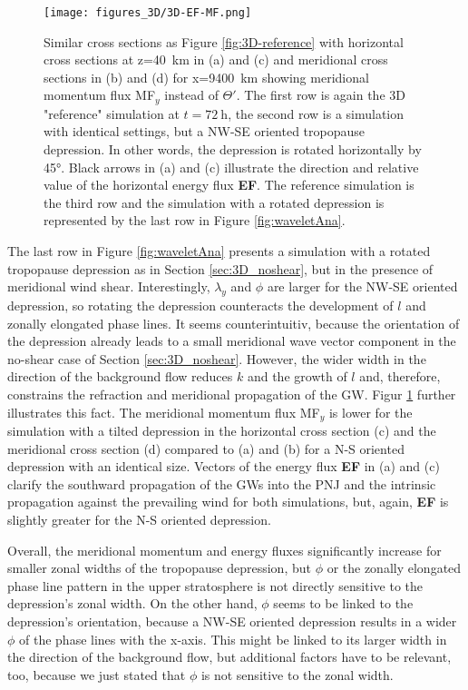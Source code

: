 \begin{figure}[t]
    \centering
    \texttt{[image: figures\_3D/3D-EF-MF.png]}
    \caption{Similar cross sections as Figure \ref{fig:3D-reference} with horizontal cross sections at z=\SI{40}{\kilo\meter} in (a) and (c) and meridional cross sections in (b) and (d) for x=\SI{9400}{\kilo\meter} showing meridional momentum flux MF$_y$ instead of $\Theta'$. The first row is again the 3D "reference" simulation at $t=\SI{72}{\hour}$, the second row is a simulation with identical settings, but a NW-SE oriented tropopause depression. In other words, the depression is rotated horizontally by 45°. Black arrows in (a) and (c) illustrate the direction and relative value of the horizontal energy flux \textbf{EF}. The reference simulation is the third row and the simulation with a rotated depression is represented by the last row in Figure \ref{fig:waveletAna}.}
    \label{fig:3D-MFy}
\end{figure}
The last row in Figure \ref{fig:waveletAna} presents a simulation with a rotated tropopause depression as in Section \ref{sec:3D_noshear}, but in the presence of meridional wind shear. Interestingly, $\lambda_y$ and $\phi$ are larger for the NW-SE oriented depression, so rotating the depression counteracts the development of $l$ and zonally elongated phase lines. It seems counterintuitiv, because the orientation of the depression already leads to a small meridional wave vector component in the no-shear case of Section \ref{sec:3D_noshear}. However, the wider width in the direction of the background flow reduces $k$ and the growth of $l$ and, therefore, constrains the refraction and meridional propagation of the GW. Figur \ref{fig:3D-MFy} further illustrates this fact. The meridional momentum flux MF$_y$ is lower for the simulation with a tilted depression in the horizontal cross section (c) and the meridional cross section (d) compared to (a) and (b) for a N-S oriented depression with an identical size. Vectors of the energy flux \textbf{EF} in (a) and (c) clarify the southward propagation of the GWs into the PNJ and the intrinsic propagation against the prevailing wind for both simulations, but, again, \textbf{EF} is slightly greater for the N-S oriented depression.

Overall, the meridional momentum and energy fluxes significantly increase for smaller zonal widths of the tropopause depression, but $\phi$ or the zonally elongated phase line pattern in the upper stratosphere is not directly sensitive to the depression's zonal width. On the other hand, $\phi$ seems to be linked to the depression's orientation, because a NW-SE oriented depression results in a wider $\phi$ of the phase lines with the x-axis. This might be linked to its larger width in the direction of the background flow, but additional factors have to be relevant, too, because we just stated that $\phi$ is not sensitive to the zonal width.

